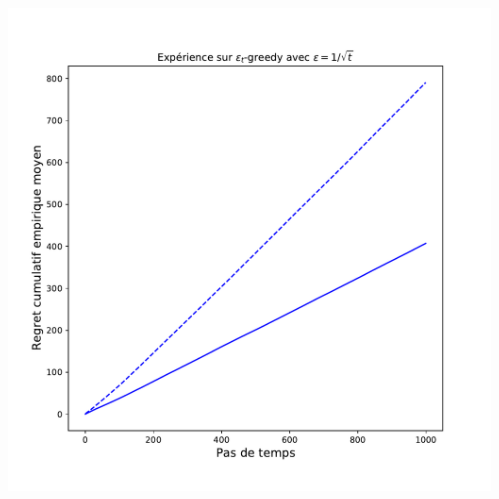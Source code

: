 \documentclass[8pt,sans,aspectratio=169]{beamer}
\begin{document}
\begin{frame}
\begin{columns}[T]
\begin{column}{0.5\linewidth}
\end{column}

\pause
\hfill

\begin{column}{0.5\linewidth}

\begin{center}
\includegraphics[scale=0.3]{contre-exemple-epsilon-greedy.pdf}
\end{center}

\end{column}

\end{columns}

\end{frame}
\end{document}
